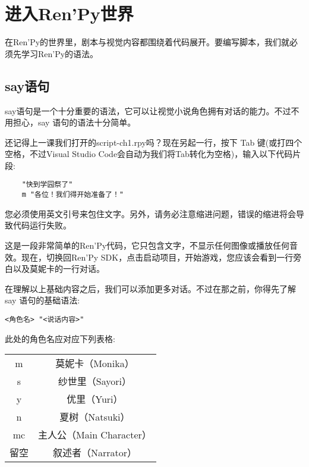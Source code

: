 \section{进入Ren'Py世界}
在Ren'Py的世界里，剧本与视觉内容都围绕着代码展开。要编写脚本，我们就必须先学习Ren'Py的语法。
\subsection{say语句}\label{subsec:3.2.1}
say语句是一个十分重要的语法，它可以让视觉小说角色拥有对话的能力。不过不用担心，say
语句的语法十分简单。

还记得上一课我们打开的script-ch1.rpy吗？现在另起一行，按下 Tab 键(或打四个空格，不过Visual Studio Code会自动为我们将Tab转化为空格)，输入以下代码片段:

\begin{lstlisting}
    "快到学园祭了"
    m "各位！我们得开始准备了！"
\end{lstlisting}

\begin{Warning}
您必须使用英文引号来包住文字。另外，请务必注意缩进问题，错误的缩进将会导致代码运行失败。
\end{Warning}

这是一段非常简单的Ren'Py代码，它只包含文字，不显示任何图像或播放任何音效。现在，切换回Ren'Py SDK，点击启动项目，开始游戏，您应该会看到一行旁白以及莫妮卡的一行对话。

在理解以上基础内容之后，我们可以添加更多对话。不过在那之前，你得先了解 say 语句的基础语法:

\begin{lstlisting}[numbers=none]
<角色名> "<说话内容>"
\end{lstlisting}


此处的角色名应对应下列表格:

\begin{center}
    \tabletail{\hline}
    \tablelasttail{\hline}
    \begin{supertabular}{|c|c|}
        \hline
        m & 莫妮卡（Monika）\\
        s & 纱世里（Sayori）\\
        y & 优里（Yuri）\\
        n & 夏树（Natsuki）\\
        mc & 主人公（Main Character）\\
        留空 & 叙述者（Narrator）\\
        \hline
    \end{supertabular}
\end{center}

